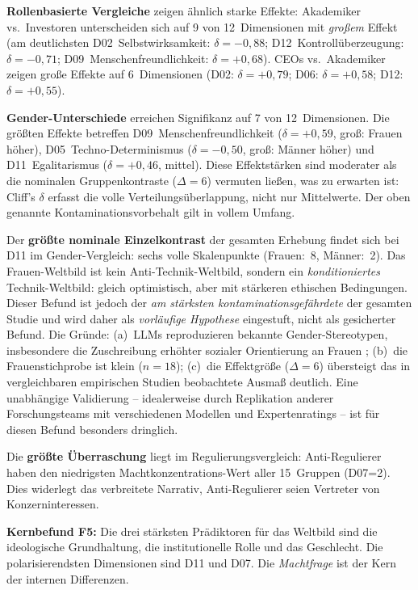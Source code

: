 \documentclass[12pt,a4paper]{article}
\begin{document}
\textbf{Rollenbasierte Vergleiche} zeigen \"ahnlich starke Effekte: Akademiker vs.\ Investoren unterscheiden sich auf 9 von 12~Dimensionen mit \emph{gro\ss{}em} Effekt (am deutlichsten D02~Selbstwirksamkeit: $\delta = -0{,}88$; D12~Kontroll\"uberzeugung: $\delta = -0{,}71$; D09~Menschenfreundlichkeit: $\delta = +0{,}68$). CEOs vs.\ Akademiker zeigen gro\ss{}e Effekte auf 6~Dimensionen (D02: $\delta = +0{,}79$; D06: $\delta = +0{,}58$; D12: $\delta = +0{,}55$).

\textbf{Gender-Unterschiede} erreichen Signifikanz auf 7 von 12~Dimensionen. Die gr\"o\ss{}ten Effekte betreffen D09~Menschenfreundlichkeit ($\delta = +0{,}59$, gro\ss{}: Frauen h\"oher), D05~Techno-Determinismus ($\delta = -0{,}50$, gro\ss{}: M\"anner h\"oher) und D11~Egalitarismus ($\delta = +0{,}46$, mittel). Diese Effektst\"arken sind moderater als die nominalen Gruppenkontraste ($\Delta = 6$) vermuten lie\ss{}en, was zu erwarten ist: Cliff's $\delta$ erfasst die volle Verteilungs\"uberlappung, nicht nur Mittelwerte. Der oben genannte Kontaminationsvorbehalt gilt in vollem Umfang.

Der \textbf{gr\"o\ss{}te nominale Einzelkontrast} der gesamten Erhebung findet sich bei D11 im Gender-Vergleich: sechs volle Skalenpunkte (Frauen:~8, M\"anner:~2). Das Frauen-Weltbild ist kein Anti-Technik-Weltbild, sondern ein \emph{konditioniertes} Technik-Weltbild: gleich optimistisch, aber mit st\"arkeren ethischen Bedingungen. Dieser Befund ist jedoch der \emph{am st\"arksten kontaminationsgef\"ahrdete} der gesamten Studie und wird daher als \emph{vorl\"aufige Hypothese} eingestuft, nicht als gesicherter Befund. Die Gr\"unde: (a)~LLMs reproduzieren bekannte Gender-Stereotypen, insbesondere die Zuschreibung erh\"ohter sozialer Orientierung an Frauen \citep{Santurkar2023}; (b)~die Frauenstichprobe ist klein ($n = 18$); (c)~die Effektgr\"o\ss{}e ($\Delta = 6$) \"ubersteigt das in vergleichbaren empirischen Studien beobachtete Ausma\ss{} deutlich. Eine unabh\"angige Validierung -- idealerweise durch Replikation anderer Forschungsteams mit verschiedenen Modellen und Expertenratings -- ist f\"ur diesen Befund besonders dringlich.

Die \textbf{gr\"o\ss{}te \"Uberraschung} liegt im Regulierungsvergleich: Anti-Regulierer haben den niedrigsten Machtkonzentrations-Wert aller 15~Gruppen (D07=2). Dies widerlegt das verbreitete Narrativ, Anti-Regulierer seien Vertreter von Konzerninteressen.

\medskip
\noindent\textbf{Kernbefund F5:} Die drei st\"arksten Pr\"adiktoren f\"ur das Weltbild sind die ideologische Grundhaltung, die institutionelle Rolle und das Geschlecht. Die polarisierendsten Dimensionen sind D11 und D07. Die \emph{Machtfrage} ist der Kern der internen Differenzen.
\end{document}
